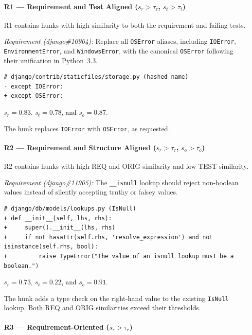 \paragraph{R1 --- Requirement and Test Aligned \textnormal{($s_r>\tau_r$, $s_t>\tau_t$)}}

R1 contains hunks with high similarity to both the requirement and failing tests.

\smallskip
\noindent\textit{Requirement (django\#10904):}
Replace all \texttt{OSError} aliases, including \texttt{IOError}, \texttt{EnvironmentError}, and \texttt{WindowsError}, with the canonical \texttt{OSError} following their unification in Python~3.3.

\begin{lstlisting}
# django/contrib/staticfiles/storage.py (hashed_name)
- except IOError:
+ except OSError:
\end{lstlisting}

\noindent
$s_r=0.83$, $s_t=0.78$, and $s_o=0.87$.

The hunk replaces \texttt{IOError} with \texttt{OSError}, as requested.

\paragraph{R2 --- Requirement and Structure Aligned \textnormal{($s_r>\tau_r$, $s_o>\tau_o$)}}

R2 contains hunks with high REQ and ORIG similarity and low TEST similarity.

\smallskip
\noindent\textit{Requirement (django\#11905):}
The \texttt{\_\_isnull} lookup should reject non-boolean values instead of silently accepting truthy or falsey values.

\begin{lstlisting}
# django/db/models/lookups.py (IsNull)
+ def __init__(self, lhs, rhs):
+     super().__init__(lhs, rhs)
+     if not hasattr(self.rhs, 'resolve_expression') and not isinstance(self.rhs, bool):
+         raise TypeError("The value of an isnull lookup must be a boolean.")
\end{lstlisting}

\noindent
$s_r=0.73$, $s_t=0.22$, and $s_o=0.91$.

The hunk adds a type check on the right-hand value to the existing \texttt{IsNull} lookup. Both REQ and ORIG similarities exceed their thresholds.

\paragraph{R3 --- Requirement-Oriented \textnormal{($s_r>\tau_r$)}}

